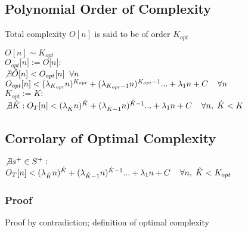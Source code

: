 \documentclass[11pt]{article}
\begin{document}
\subsection{Polynomial Order of Complexity}
Total complexity $O[n]$ is said to be of order $K_{opt}$
\begin{center}
$
 O[n] \sim K_{opt}
$
\\ \vspace{2mm}
$O_{opt}\lbrack n \rbrack := O \lbrack n \rbrack :$
\\ \vspace{2mm}
$ \not \exists \hat{O} \lbrack n \rbrack < O_{opt}\lbrack n \rbrack \hspace{2mm} \forall n$
\\ \vspace{2mm}
$O_{opt}[n] < (\lambda_{K_{opt}} n)^{K_{opt}} + (\lambda_{K_{opt}-1} n)^{K_{opt}-1}... + \lambda_1 n +  C \hspace{4mm} \forall n$
\\ \vspace{2mm}
$K_{opt} := K :$
\\ \vspace{2mm}
$\not \exists \hat{K} : O_{T}[n] < (\lambda_{\hat{K}} n)^{\hat{K}} + (\lambda_{\hat{K}-1} n)^{\hat{K}-1}... + \lambda_1 n +  C \hspace{4mm} \forall n,\hspace{1mm} \hat{K} < K$
\end{center}








\subsection{Corrolary of Optimal Complexity}
\begin{center}
$\not \exists s^+ \in S^+ :$
\\ \vspace{2mm}
$O_{T}[n] < (\lambda_{\hat{K}} n)^{\hat{K}} + (\lambda_{\hat{K}-1} n)^{\hat{K}-1}... + \lambda_1 n +  C \hspace{4mm} \forall n,\hspace{1mm} \hat{K} < K_{opt}$
\end{center}

\subsubsection{Proof}
Proof by contradiction; definition of optimal complexity
\end{document}
